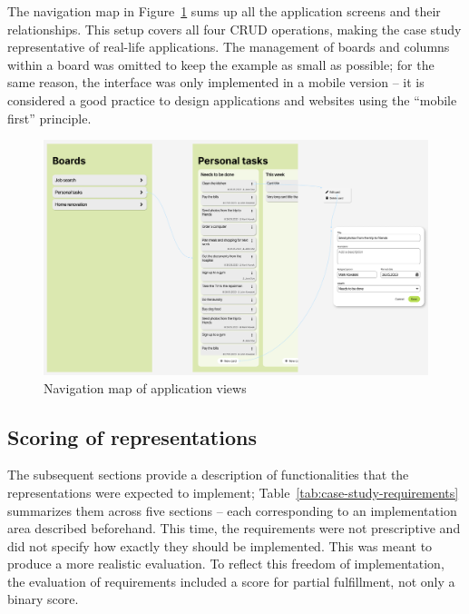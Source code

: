 The navigation map in Figure~\ref{fig:3-4-navigation-map} sums up all the application screens and their relationships.
This setup covers all four CRUD operations, making the case study representative of real-life applications.
The management of boards and columns within a board was omitted to keep the example as small as possible;
for the same reason, the interface was only implemented in a mobile version -- it is considered a good practice to design applications and websites using the \enquote{mobile first} principle.

\begin{figure}
    \centering
    \includegraphics[width=\textwidth]{3-research-methodology/nav-map}
    \caption{Navigation map of application views}
    \label{fig:3-4-navigation-map}
\end{figure}

\subsection{Scoring of representations}\label{subsec:scoring-of-representations2}

The subsequent sections provide a description of functionalities that the representations were expected to implement;
Table~\ref{tab:case-study-requirements} summarizes them across five sections -- each corresponding to an implementation area described beforehand.
This time, the requirements were not prescriptive and did not specify how exactly they should be implemented.
This was meant to produce a more realistic evaluation.
To reflect this freedom of implementation, the evaluation of requirements included a score for partial fulfillment, not only a binary score.

